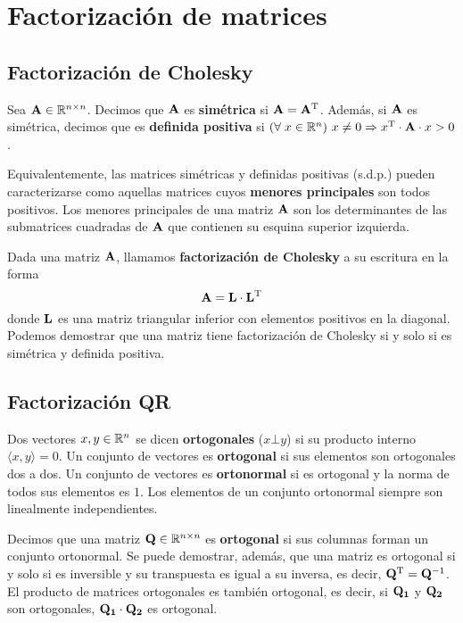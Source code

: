 \section{Factorización de matrices}
\subsection{Factorización de Cholesky}

Sea $\mathbf{A} \in \mathbb{R}^{n \times n}$. Decimos que $\mathbf{A}$ es
\textbf{simétrica} si $\mathbf{A} = \mathbf{A}^{\mathrm{T}}$. Además, si $\mathbf{A}$ es
simétrica, decimos que es \textbf{definida positiva} si
$\left(\forall\;x \in \mathbb{R}^{n}\right)\, x \neq 0 \Rightarrow x^{\mathrm{T}} \cdot \mathbf{A} \cdot x > 0$.

Equivalentemente, las matrices simétricas y definidas positivas (s.d.p.)
pueden caracterizarse como aquellas matrices cuyos \textbf{menores
principales} son todos positivos. Los menores principales de una matriz
$\mathbf{A}$ son los determinantes de las submatrices cuadradas de $\mathbf{A}$ que
contienen su esquina superior izquierda.

Dada una matriz $\mathbf{A}$, llamamos \textbf{factorización de Cholesky} a su
escritura en la forma
\[ \mathbf{A} = \mathbf{L} \cdot \mathbf{L}^{\mathrm{T}} \]
donde $\mathbf{L}$ es una matriz triangular inferior con elementos positivos
en la diagonal. Podemos demostrar que una matriz tiene factorización de
Cholesky si y solo si es simétrica y definida positiva.

\subsection{Factorización QR}

Dos vectores $x, y \in \mathbb{R}^{n}$ se dicen \textbf{ortogonales} ($x \bot y$)
si su producto interno $\langle x,y \rangle = 0$. Un conjunto de vectores es
\textbf{ortogonal} si sus elementos son ortogonales dos a dos. Un conjunto de
vectores es \textbf{ortonormal} si es ortogonal y la norma de todos sus
elementos es $1$. Los elementos de un conjunto ortonormal siempre son
linealmente independientes.

Decimos que una matriz $\mathbf{Q} \in \mathbb{R}^{n \times n}$ es \textbf{ortogonal}
si sus columnas forman un conjunto ortonormal. Se puede demostrar, además, que
una matriz es ortogonal si y solo si es inversible y su transpuesta es igual a
su inversa, es decir, $\mathbf{Q}^{\mathrm{T}} = \mathbf{Q}^{-1}$. El producto de matrices
ortogonales es también ortogonal, es decir, si $\mathbf{Q_1}$ y $\mathbf{Q_2}$ son
ortogonales, $\mathbf{Q_1} \cdot \mathbf{Q_2}$ es ortogonal.

